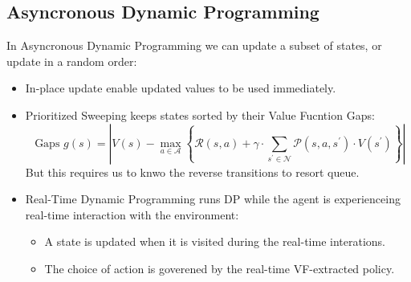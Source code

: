 \documentclass[11pt]{article}
\begin{document}
\subsection*{Asyncronous Dynamic Programming}
In Asyncronous Dynamic Programming we can update a subset of states, or update in a random order:
\begin{itemize}
    \item In-place update enable updated values to be used immediately.
    \item Prioritized Sweeping keeps states sorted by their Value Fucntion Gaps:
    $$
    \text { Gaps } g(s)=\left|V(s)-\max _{a \in \mathcal{A}}\left\{\mathcal{R}(s, a)+\gamma \cdot \sum_{s^{\prime} \in \mathcal{N}} \mathcal{P}\left(s, a, s^{\prime}\right) \cdot V\left(s^{\prime}\right)\right\}\right|
    $$
    But this requires us to knwo the reverse transitions to resort queue.
    \item Real-Time Dynamic Programming runs DP while the agent is experienceing real-time interaction with the environment:
    \begin{itemize}
        \item A state is updated when it is visited during the real-time interations.
        \item The choice of action is goverened by the real-time VF-extracted policy. 
    \end{itemize}
\end{itemize}
\end{document}
